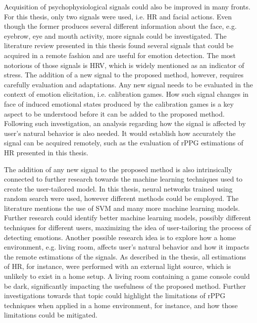 Acquisition of psychophysiological signals could also be improved in many fronts. For this thesis, only two signals were used, i.e. HR and facial actions. Even though the former produces several different information about the face, e.g. eyebrow, eye and mouth activity, more signals could be investigated. The literature review presented in this thesis found several signals that could be acquired in a remote fashion and are useful for emotion detection. The most notorious of those signals is HRV, which is widely mentioned as an indicator of stress. The addition of a new signal to the proposed method, however, requires carefully evaluation  and adaptations. Any new signal needs to be evaluated in the context of emotion elicitation, i.e. calibration games. How such signal changes in face of induced emotional states produced by the calibration games is a key aspect to be understood before it can be added to the proposed method. Following such investigation, an analysis regarding how the signal is affected by user's natural behavior is also needed. It would establish how accurately the signal can be acquired remotely, such as the evaluation of rPPG estimations of HR presented in this thesis.

The addition of any new signal to the proposed method is also intrinsically connected to further research towards the machine learning techniques used to create the user-tailored model. In this thesis, neural networks trained using random search were used, however different methods could be employed. The literature mentions the use of SVM and many more machine learning models. Further research could identify better machine learning models, possibly different techniques for different users, maximizing the idea of user-tailoring the process of detecting emotions. Another possible research idea is to explore how a home environment, e.g. living room, affects user's natural behavior and how it impacts the remote estimations of the signals. As described in the thesis, all estimations of HR, for instance, were performed with an external light source, which is unlikely to exist in a home setup. A living room containing a game console could be dark, significantly impacting the usefulness of the proposed method. Further investigations towards that topic could highlight the limitations of rPPG techniques when applied in a home environment, for instance, and how those limitations could be mitigated.

